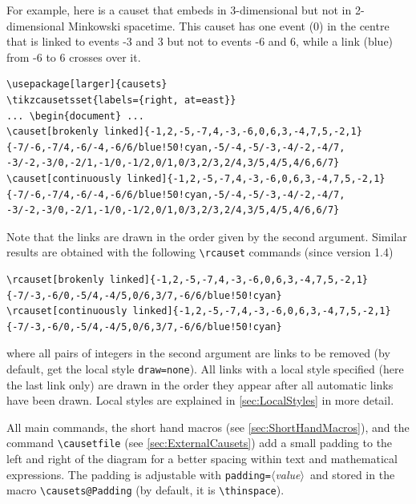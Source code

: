 \documentclass[12pt]{article}
\newcommand*{\PH}[1][value]{{\small\itshape$\langle$#1$\rangle$}} %
\begin{document}
For example, here is a causet that embeds in 3-dimensional but not in 2-dimensional Minkowski spacetime.
This causet has one event (0) in the centre that is linked to events -3 and 3 but not to events -6 and 6, while a link (blue) from -6 to 6 crosses over it.
\begin{lstlisting}
\usepackage[larger]{causets}
\tikzcausetsset{labels={right, at=east}}
... \begin{document} ...
\causet[brokenly linked]{-1,2,-5,-7,4,-3,-6,0,6,3,-4,7,5,-2,1} {-7/-6,-7/4,-6/-4,-6/6/blue!50!cyan,-5/-4,-5/-3,-4/-2,-4/7, -3/-2,-3/0,-2/1,-1/0,-1/2,0/1,0/3,2/3,2/4,3/5,4/5,4/6,6/7}
\causet[continuously linked]{-1,2,-5,-7,4,-3,-6,0,6,3,-4,7,5,-2,1} {-7/-6,-7/4,-6/-4,-6/6/blue!50!cyan,-5/-4,-5/-3,-4/-2,-4/7, -3/-2,-3/0,-2/1,-1/0,-1/2,0/1,0/3,2/3,2/4,3/5,4/5,4/6,6/7}
\end{lstlisting}
\begin{center}
  \hspace{1.5cm}
\end{center}
Note that the links are drawn in the order given by the second argument.
Similar results are obtained with the following \lstinline&\rcauset& commands (since version 1.4) 
\begin{lstlisting}
\rcauset[brokenly linked]{-1,2,-5,-7,4,-3,-6,0,6,3,-4,7,5,-2,1} {-7/-3,-6/0,-5/4,-4/5,0/6,3/7,-6/6/blue!50!cyan}
\rcauset[continuously linked]{-1,2,-5,-7,4,-3,-6,0,6,3,-4,7,5,-2,1} {-7/-3,-6/0,-5/4,-4/5,0/6,3/7,-6/6/blue!50!cyan}
\end{lstlisting}
where all pairs of integers in the second argument are links to be removed (by default, get the local style \lstinline&draw=none&).
All links with a local style specified (here the last link only) are drawn in the order they appear after all automatic links have been drawn.
Local styles are explained in \autoref{sec:LocalStyles} in more detail.

All main commands, the short hand macros (see \autoref{sec:ShortHandMacros}), and the command \lstinline&\causetfile& (see \autoref{sec:ExternalCausets}) add a small padding to the left and right of the diagram for a better spacing within text and mathematical expressions.
The padding is adjustable with \lstinline&padding=&\PH\ and stored in the macro \lstinline&\causets@Padding& (by default, it is \lstinline&\thinspace&).
\end{document}

